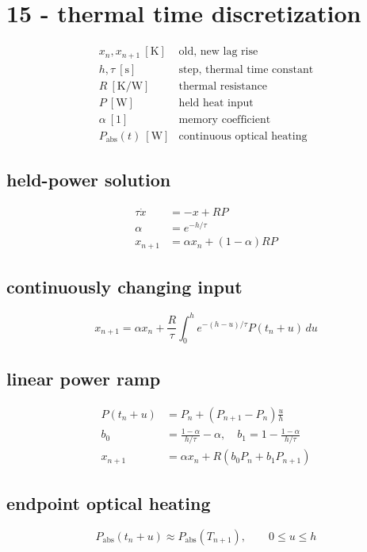 \section*{15 - thermal time discretization}

\[
\begin{array}{ll}x_n,x_{n+1}\ [\mathrm K]&\text{old, new lag rise}\\[0.6em]h,\tau\ [\mathrm s]&\text{step, thermal time constant}\\[0.6em]R\ [\mathrm{K/W}]&\text{thermal resistance}\\[0.6em]P\ [\mathrm W]&\text{held heat input}\\[0.6em]\alpha\ [1]&\text{memory coefficient}\\[0.6em]P_{\mathrm{abs}}(t)\ [\mathrm W]&\text{continuous optical heating}\end{array}
\]

\subsection*{held-power solution}
\[
\displaystyle \begin{aligned}\tau\dot x&=-x+RP\\\alpha&=e^{-h/\tau}\\x_{n+1}&=\alpha x_n+(1-\alpha)RP\end{aligned}
\]

\subsection*{continuously changing input}
\[
\displaystyle x_{n+1}=\alpha x_n+\frac R\tau\int_0^h e^{-(h-u)/\tau}P(t_n+u)\,du
\]

\subsection*{linear power ramp}
\[
\displaystyle \begin{aligned}P(t_n+u)&=P_n+(P_{n+1}-P_n)\frac uh\\b_0&=\frac{1-\alpha}{h/\tau}-\alpha,\quad b_1=1-\frac{1-\alpha}{h/\tau}\\x_{n+1}&=\alpha x_n+R(b_0P_n+b_1P_{n+1})\end{aligned}
\]

\subsection*{endpoint optical heating}
\[
\displaystyle P_{\mathrm{abs}}(t_n+u)\approx P_{\mathrm{abs}}(T_{n+1}),\qquad0\le u\le h
\]
